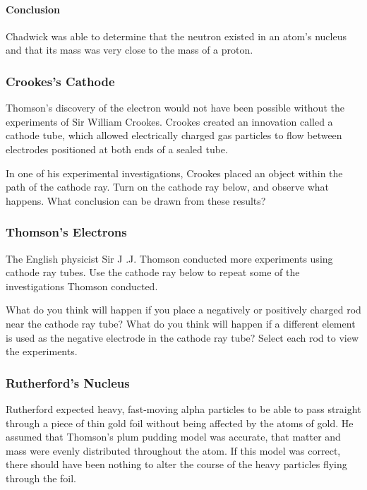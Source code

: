 \paragraph{Conclusion} Chadwick was able to determine that the neutron existed in an atom's nucleus and that its mass was very close to the mass of a proton.

\subsubsection*{Crookes's Cathode}

Thomson's discovery of the electron would not have been possible without the experiments of Sir William Crookes. Crookes created an innovation called a cathode tube, which allowed electrically charged gas particles to flow between electrodes positioned at both ends of a sealed tube.

In one of his experimental investigations, Crookes placed an object within the path of the cathode ray. Turn on the cathode ray below, and observe what happens. What conclusion can be drawn from these results?

\subsubsection*{Thomson's Electrons}

The English physicist Sir J .J. Thomson conducted more experiments using cathode ray tubes. Use the cathode ray below to repeat some of the investigations Thomson conducted.

What do you think will happen if you place a negatively or positively charged rod near the cathode ray tube? What do you think will happen if a different element is used as the negative electrode in the cathode ray tube? Select each rod to view the experiments.

\subsubsection*{Rutherford's Nucleus}

Rutherford expected heavy, fast-moving alpha particles to be able to pass straight through a piece of thin gold foil without being affected by the atoms of gold. He assumed that Thomson's plum pudding model was accurate, that matter and mass were evenly distributed throughout the atom. If this model was correct, there should have been nothing to alter the course of the heavy particles flying through the foil.

